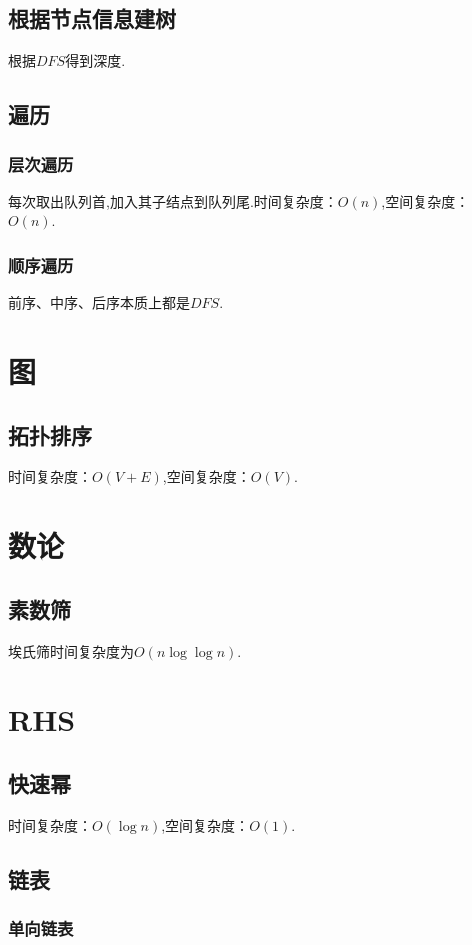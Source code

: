 \documentclass{code}
\newcommand{\fzd}[1]{\ensuremath{O\left(#1\right)}}
\newcommand{\code}[1]{}
\begin{document}
\subsection{根据节点信息建树}
根据$DFS$得到深度.
\code{BuildTreeByDFS}
\subsection{遍历}
\subsubsection{层次遍历}
每次取出队列首,加入其子结点到队列尾.时间复杂度：\fzd{n},空间复杂度：\fzd{n}.
\code{LevelOrderTraversal}
\subsubsection{顺序遍历}
前序、中序、后序本质上都是$DFS$.
\code{OrderTraversal}
\newpage
\section{图}
\subsection{拓扑排序}
时间复杂度：\fzd{V + E},空间复杂度：\fzd{V}.
\code{TopologicalSort}
\newpage
\section{数论}
\subsection{素数筛}
埃氏筛时间复杂度为\fzd{n \log \log n}.
\code{SieveOfEratosthenes}
\newpage
\section{RHS}
\subsection{快速幂}
时间复杂度：\fzd{\log n},空间复杂度：\fzd{1}.
\code{FastPower}
\subsection{链表}
\subsubsection{单向链表}
\code{SingleLinkedList}
\end{document}
